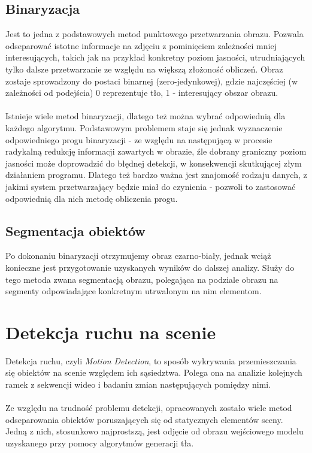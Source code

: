 \subsection{Binaryzacja}
Jest to jedna z podstawowych metod punktowego przetwarzania obrazu.  Pozwala odseparować istotne informacje na zdjęciu z pominięciem zależności mniej interesujących, takich jak na przykład konkretny poziom jasności, utrudniających tylko dalsze przetwarzanie ze względu na większą złożoność obliczeń. Obraz zostaje sprowadzony do postaci binarnej (zero-jedynkowej), gdzie najczęściej (w zależności od podejścia) 0 reprezentuje tło, 1 - interesujący obszar obrazu.  
\paragraph{}
Istnieje wiele metod binaryzacji, dlatego też można wybrać odpowiednią dla każdego algorytmu. Podstawowym problemem staje się jednak wyznaczenie odpowiedniego progu binaryzacji - ze względu na następującą w procesie radykalną redukcję informacji zawartych w obrazie, źle dobrany graniczny poziom jasności może doprowadzić do błędnej detekcji, w konsekwencji skutkującej złym działaniem programu. Dlatego też bardzo ważna jest znajomość rodzaju danych, z jakimi system przetwarzający będzie miał do czynienia - pozwoli to zastosować odpowiednią dla nich metodę obliczenia progu.
\subsection{Segmentacja obiektów}
Po dokonaniu binaryzacji otrzymujemy obraz czarno-biały, jednak wciąż konieczne jest przygotowanie uzyskanych wyników do dalszej analizy. Służy do tego metoda zwana segmentacją obrazu, polegająca na podziale obrazu na segmenty odpowiadające konkretnym utrwalonym na nim elementom.
\section{Detekcja ruchu na scenie}
Detekcja ruchu, czyli \textit{Motion Detection}, to sposób wykrywania przemieszczania się obiektów na scenie względem ich sąsiedztwa. Polega ona na analizie kolejnych ramek z sekwencji wideo i badaniu zmian następujących pomiędzy nimi.
\paragraph{}
Ze względu na trudność problemu detekcji, opracowanych zostało wiele metod odseparowania obiektów poruszających się od statycznych elementów sceny. Jedną z nich, stosunkowo najprostszą, jest odjęcie od obrazu wejściowego modelu uzyskanego przy pomocy algorytmów generacji tła.
